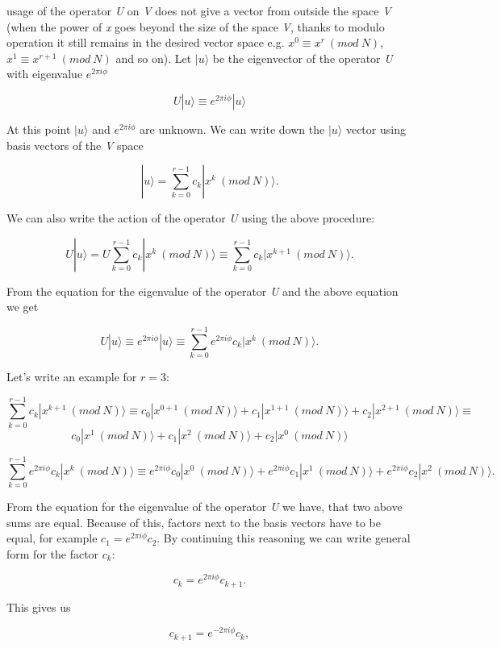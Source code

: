usage of the operator \textit{U} on \textit{V} does not give a vector from outside the space \textit{V} (when the power of \textit{x} goes beyond the size of the space \textit{V}, thanks to modulo operation it still remains in the desired vector space e.g. $x^0 \equiv x^r\ (mod\ N)$, $x^1 \equiv x^{r+1}\ (mod\ N)$ and so on). Let $|u\rangle$ be the eigenvector of the operator \textit{U} with eigenvalue $e^{2 \pi i \phi}$

\[ U|u\rangle \equiv e^{2 \pi i \phi}|u\rangle\]

At this point $|u\rangle$ and $e^{2 \pi i \phi}$ are unknown. We can write down the $|u\rangle$ vector using basis vectors of the \textit{V} space

\[ |u\rangle = \sum_{k = 0}^{r - 1} c_k |x^k\ (mod\ N)\rangle.\]

We can also write the action of the operator \textit{U} using the above procedure:

\[ U|u\rangle = U\sum_{k = 0}^{r - 1} c_k |x^k\ (mod\ N)\rangle \equiv \sum_{k = 0}^{r - 1} c_k |x^{k+1}\ (mod\ N)\rangle.\]

From the equation for the eigenvalue of the operator \textit{U} and the above equation we get

\[ U|u\rangle \equiv e^{2 \pi i \phi}|u\rangle \equiv \sum_{k = 0}^{r - 1} e^{2 \pi i \phi} c_k |x^k\ (mod\ N)\rangle.\]

Let's write an example for $r = 3$:

\[ \sum_{k = 0}^{r - 1} c_k |x^{k+1}\ (mod\ N)\rangle \equiv c_0|x^{0 + 1}\ (mod\ N)\rangle + c_1|x^{1 + 1}\ (mod\ N)\rangle + c_2|x^{2 + 1}\ (mod\ N)\rangle \equiv \]
\[ c_0|x^{1}\ (mod\ N)\rangle + c_1|x^{2}\ (mod\ N)\rangle + c_2|x^{0}\ (mod\ N)\rangle \]

\[ \sum_{k = 0}^{r - 1} e^{2 \pi i \phi} c_k |x^k\ (mod\ N)\rangle \equiv e^{2 \pi i \phi}c_0|x^0\ (mod\ N)\rangle + e^{2 \pi i \phi}c_1|x^1\ (mod\ N)\rangle + e^{2 \pi i \phi}c_2|x^2\ (mod\ N)\rangle.\]

From the equation for the eigenvalue of the operator \textit{U} we have, that two above sums are equal. Because of this, factors next to the basis vectors have to be equal, for example $c_1 = e^{2 \pi i \phi}c_2$. By continuing this reasoning we can write general form for the factor $c_k$:

\[ c_k = e^{2 \pi i \phi} c_{k + 1}.\]

This gives us

\[ c_{k+1} = e^{- 2 \pi i \phi}c_k,\]

